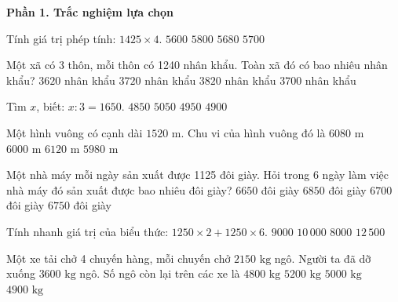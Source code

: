 \textbf{Phần 1. Trắc nghiệm lựa chọn}

\begin{ex} %
Tính giá trị phép tính: $1425 \times 4$.
\choice
{$5600$}
{$5800$}
{$5680$}
{\True $5700$}
\end{ex}

\begin{ex} %
Một xã có 3 thôn, mỗi thôn có 1240 nhân khẩu. Toàn xã đó có bao nhiêu nhân khẩu?
\choice
{$3620$ nhân khẩu}
{\True $3720$ nhân khẩu}
{$3820$ nhân khẩu}
{$3700$ nhân khẩu}
\end{ex}

\begin{ex} %
Tìm $x$, biết: $x : 3 = 1650$.
\choice
{$4850$}
{$5050$}
{\True $4950$}
{$4900$}
\end{ex}

\begin{ex} %
Một hình vuông có cạnh dài $1520\text{ m}$. Chu vi của hình vuông đó là
\choice
{\True $6080\text{ m}$}
{$6000\text{ m}$}
{$6120\text{ m}$}
{$5980\text{ m}$}
\end{ex}

\begin{ex} %
Một nhà máy mỗi ngày sản xuất được 1125 đôi giày. Hỏi trong 6 ngày làm việc nhà máy đó sản xuất được bao nhiêu đôi giày?
\choice
{$6650$ đôi giày}
{$6850$ đôi giày}
{$6700$ đôi giày}
{\True $6750$ đôi giày}
\end{ex}

\begin{ex} %
Tính nhanh giá trị của biểu thức: $1250 \times 2 + 1250 \times 6$.
\choice
{$9000$}
{\True $10\,000$}
{$8000$}
{$12\,500$}
\end{ex}

\begin{ex} %
Một xe tải chở 4 chuyến hàng, mỗi chuyến chở $2150\text{ kg}$ ngô. Người ta đã dỡ xuống $3600\text{ kg}$ ngô. Số ngô còn lại trên các xe là
\choice
{$4800\text{ kg}$}
{$5200\text{ kg}$}
{\True $5000\text{ kg}$}
{$4900\text{ kg}$}
\end{ex}


